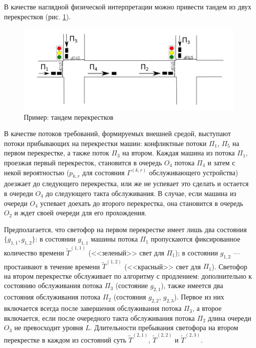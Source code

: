 В качестве наглядной физической интерпретации можно привести тандем из двух перекрестков (рис. \ref{crossroads}).
\begin{figure}[h]\centering
\includegraphics[scale=0.5]{Pictures/Crossroads.png} 
\caption{Пример: тандем перекрестков}
\label{crossroads}
\end{figure}
В качестве потоков требований,  формируемых внешней средой,  выступают потоки прибывающих на перекрестки машин: конфликтные потоки $\Pi_1$,  $\Pi_5$ на первом перекрестке,  а также поток $\Pi_3$ на втором. Каждая машина из потока $\Pi_1$,  проезжая первый перекресток,  становится в очередь $O_4$ потока $\Pi_4$ и затем с некой вероятностью ($p_{k, r}$ для состояния $\Gamma^{(k, r)}$ обслуживающего устройства) доезжает до следующего перекрестка,  или же не успевает это сделать и остается в очереди $O_4$ до следующего такта обслуживания. В случае,  если машина из очереди $O_4$ успевает доехать до второго перекрестка,  она становится в очередь $O_2$ и ждет своей очереди для его прохождения.

Предполагается,  что светофор на первом перекрестке имеет лишь два состояния $\{g_{1, 1}, g_{1, 2}\}$: в состоянии $g_{1, 1}$ машины потока $\Pi_1$ пропускаются фиксированное количество времени $\widetilde T^{(1, 1)}$ (<<зеленый>> свет для $\Pi_1$); в состоянии $g_{1, 2}$ --- простаивают в течение времени $\widetilde T^{(1, 2)}$ (<<красный>> свет для $\Pi_1$). Светофор на втором перекрестке обслуживает по алгоритму с продлением: дополнительно к состоянию обслуживания потока $\Pi_3$ (состояние $g_{2, 1}$),  также имеется два состояния обслуживания потока $\Pi_2$ (состояния $g_{2, 2}$,  $g_{2, 3}$). Первое из них включается всегда после завершения обслуживания потока $\Pi_3$,  а второе включается,  если после очередного такта обслуживания потока $\Pi_2$ длина очереди $O_3$ не превосходит уровня $L$.
Длительности пребывания светофора на втором перекрестке в каждом из состояний суть $\widetilde T^{(2, 1)}$,  $\widetilde T^{(2, 2)}$ и $\widetilde T^{(2, 3)}$.


